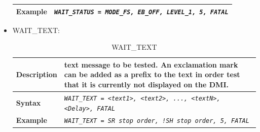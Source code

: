 \begin{itemize}
\begin{longtable}{|l|l|l|}
			\hline


				\begin{minipage}[t]{0.22\linewidth} \textbf{Example} \end{minipage}
			&	\multicolumn{2}{l|}{ \begin{minipage}[t]{0.78\linewidth} \emph{\texttt{WAIT\_STATUS = MODE\_FS, EB\_OFF, LEVEL\_1, 5, FATAL}} \end{minipage} } \\

			\hline\hline

		\end{longtable}

		\item WAIT\_TEXT:

		\begin{longtable}{|l|l|}
			\caption{WAIT\_TEXT}\\
			\hline

				\begin{minipage}[t]{0.22\linewidth} \textbf{Description} \end{minipage}
			&	\begin{minipage}[t]{0.78\linewidth}  text message to be tested. An exclamation mark can be added as a prefix to the text in order test that it is currently not displayed on the DMI. \end{minipage} \\

			\hline

				\begin{minipage}[t]{0.22\linewidth} \textbf{Syntax}	\end{minipage}
			&	\begin{minipage}[t]{0.78\linewidth} \emph{\texttt{WAIT\_TEXT = <text1>, <text2>, ..., <textN>, <Delay>, FATAL}} \end{minipage} \\

			\hline\hline

			\hline

				\begin{minipage}[t]{0.22\linewidth} \textbf{Example}	\end{minipage}
			&	\begin{minipage}[t]{0.78\linewidth} \emph{\texttt{WAIT\_TEXT = SR stop order, !SH stop order, 5, FATAL}} \end{minipage} \\

			\hline\hline

		\end{longtable}
		

\end{itemize}
